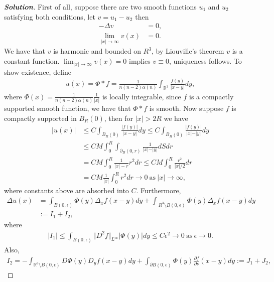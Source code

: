 \documentclass[11pt,reqno]{amsart}
\newcommand{\R}{\mathbb{R}}
\newcommand{\<}{\langle}
\renewcommand{\>}{\rangle}
\newcommand{\norm}[1]{\vert#1\vert}
\newcommand{\nnorm}[1]{\Vert#1\Vert}
\newcommand{\pa}{\partial}
\begin{document}
\begin{enumerate}[label={\arabic*.}]
\begin{proof}[\bf{Solution}]
First of all, suppose there are two smooth functions $u_1$ and $u_2$ satisfying both conditions, let $v= u_1 - u_2$ then
\begin{align*}
-\Delta v & =0,\\
\lim_{\norm{x} \rightarrow \infty } v(x) & =0.
\end{align*}
We have that $v$ is harmonic and bounded on $R^3$, by Liouville's theorem $v$ is a constant function. $\lim_{\norm{x} \rightarrow \infty} v(x) = 0$ implies $v\equiv 0$, uniqueness follows. To show existence, define 
\begin{align*}
u(x) = \Phi \ast f = \frac{1}{n(n-2) \alpha(n)} \int_{\R^3} \frac{f(y)}{\norm{x-y}} dy,
\end{align*} 
where $\Phi (x) = \frac{1}{n(n-2) \alpha (n)} \frac{1}{\norm{x}} $ is locally integrable, since $f$ is a compactly supported smooth function, we have that $\Phi \ast f$ is smooth. Now suppose $f$ is compactly supported in $B_{R}(0)$, then for $\norm{x}>2R$ we have
\begin{align*}
\norm{u(x)} 
&\leq 
C \int_{B_R (0)} \frac{\norm{f(y)}}{\norm{x-y}}dy \leq C \int_{B_R (0)} \frac{\norm{f(y)}}{\norm{x}-\norm{y}}dy\\
& \leq CM \int_0^R \int_{\pa_B(0,r)} \frac{1}{\norm{x} - \norm{y}} dS dr\\
& =
CM \int_0^R \frac{1}{\norm{x} -r} r^2 dr \leq CM \int_0^R \frac{r^2}{\norm{x} /2} dr\\
& = CM \frac{1}{\norm{x}} \int_0^R r^2 dr \rightarrow 0 \ \text{as}\ \norm{x}\rightarrow \infty,
\end{align*}
 where constants above are absorbed into $C$.
 Furthermore,
\begin{align*}
 \Delta u (x) 
 &= \int_{B(0, \epsilon)} \Phi (y) \Delta_x f(x-y) dy + \int_{\ R^3 \setminus B(0, \epsilon)} \Phi (y) \Delta_x f(x-y) dy\\
 &:=
 I_1 + I_2,
\end{align*}
where 
\begin{align}
\norm{I_1} \leq \int_{B(0, \epsilon)} \nnorm{D^2 f}_{L^\infty} \norm{\Phi (y)}  dy \leq C\epsilon^2  \rightarrow 0  \ \text{as}\ \epsilon \rightarrow 0.
\label{eq3}
\end{align}
Also, 
\begin{align*}
I_2 = -\int_{\R^3 \setminus B(0,\epsilon)} D\Phi(y) D_y f(x-y) dy + \int_{\pa B(0,\epsilon)} \Phi (y) \frac{\pa f}{\pa \nu}(x-y) dy := J_1 + J_2,
\end{align*}

\end{proof}
\end{enumerate}
\end{document}
